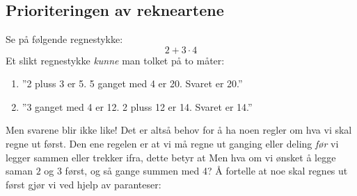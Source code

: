 



\section{\rrek}
\subsection*{Prioriteringen av rekneartene}
Se på følgende regnestykke:
\[ 2+3\cdot4 \]
Et slikt regnestykke \textsl{kunne} man tolket på to måter:
\begin{enumerate}
	\item ''2 pluss 3 er 5. 5 ganget med 4 er 20. Svaret er 20.''
	\item ''3 ganget med 4 er 12. 2 pluss 12 er 14. Svaret er 14.''
\end{enumerate}
Men svarene blir ikke like! Det er altså behov for å ha noen regler om hva vi skal regne ut først. Den ene regelen er at vi må regne ut ganging eller deling \textsl{før} vi legger sammen eller trekker ifra, dette betyr at \regv
\st{ \vs
{}
}
Men hva om vi ønsket å legge saman $ 2 $ og $ 3 $ først, og så gange summen med 4? Å fortelle at noe skal regnes ut først gjør vi ved hjelp av paranteser: \regv
\st{\vs
{}
}\regv

\newpage
{}
